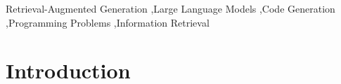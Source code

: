 \documentclass[preprint,12pt]{elsarticle}
\begin{document}
\begin{frontmatter}
\begin{abstract}
\end{abstract}




\begin{keyword}
Retrieval-Augmented Generation \sep Large Language Models \sep Code Generation \sep Programming Problems \sep Information Retrieval 



\end{keyword}

\end{frontmatter}



\section{Introduction}
\label{sec:introduction}
\end{document}
